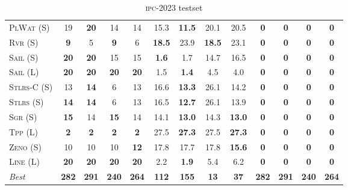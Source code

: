 \documentclass[11pt]{article}
\begin{document}
\begin{table}[tb]
{\begin{tabular}{|l||cccc||cccc||cccc||}
\textsc{PlWat} (S)&19&\textbf{20}&14&14&15.3&\textbf{11.5}&20.1&20.5&\textbf{0}&\textbf{0}&\textbf{0}&\textbf{0}\\
\textsc{Rvr} (S)&\textbf{9}&5&\textbf{9}&6&\textbf{18.5}&23.9&\textbf{18.5}&23.1&\textbf{0}&\textbf{0}&\textbf{0}&\textbf{0}\\
\textsc{Sail} (S)&\textbf{20}&\textbf{20}&15&15&\textbf{1.6}&1.7&14.7&16.5&\textbf{0}&\textbf{0}&\textbf{0}&\textbf{0}\\
\textsc{Sail} (L)&\textbf{20}&\textbf{20}&\textbf{20}&\textbf{20}&1.5&\textbf{1.4}&4.5&4.0&\textbf{0}&\textbf{0}&\textbf{0}&\textbf{0}\\
\textsc{Stlrs-C} (S)&13&\textbf{14}&6&13&16.6&\textbf{13.3}&26.1&14.2&\textbf{0}&\textbf{0}&\textbf{0}&\textbf{0}\\
\textsc{Stlrs} (S)&\textbf{14}&\textbf{14}&6&13&16.5&\textbf{12.7}&26.1&13.9&\textbf{0}&\textbf{0}&\textbf{0}&\textbf{0}\\
\textsc{Sgr} (S)&\textbf{15}&14&\textbf{15}&14&14.1&\textbf{13.0}&14.3&\textbf{13.0}&\textbf{0}&\textbf{0}&\textbf{0}&\textbf{0}\\
\textsc{Tpp} (L)&\textbf{2}&\textbf{2}&\textbf{2}&\textbf{2}&27.5&\textbf{27.3}&27.5&\textbf{27.3}&\textbf{0}&\textbf{0}&\textbf{0}&\textbf{0}\\
\textsc{Zeno} (S)&10&10&10&\textbf{12}&17.8&17.7&17.8&\textbf{15.6}&\textbf{0}&\textbf{0}&\textbf{0}&\textbf{0}\\
\textsc{Line} (L)&\textbf{20}&\textbf{20}&\textbf{20}&\textbf{20}&2.2&\textbf{1.9}&5.4&6.2&\textbf{0}&\textbf{0}&\textbf{0}&\textbf{0}
\\\hline
\textit{Best}&\textbf{282}&\textbf{291}&\textbf{240}&\textbf{264}&\textbf{112}&\textbf{155}&\textbf{13}&\textbf{37}&\textbf{282}&\textbf{291}&\textbf{240}&\textbf{264}\\\hline

        \end{tabular}}
        \caption{\textsc{ipc}-2023 testset}
        \label{tab:ipc}
        \end{table}
        
\end{document}
